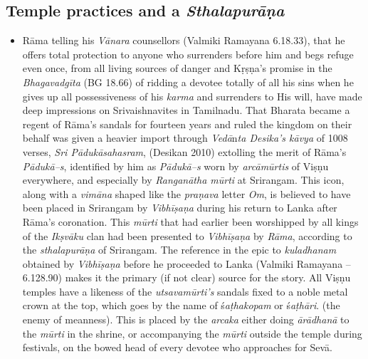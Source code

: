 \subsection*{Temple practices and a \textit{Sthalapurāṇa}}

\begin{itemize}
\item Rāma telling his \textit{Vānara} counsellors (Valmiki Ramayana 6.18.33), that he offers total protection to anyone who surrenders before him and begs refuge even once, from all living sources of danger and Kṛṣṇa’s promise in the \textit{Bhagavadgīta} (BG 18.66) of ridding a devotee totally of all his sins when he gives up all possessiveness of his \textit{karma} and surrenders to His will, have made deep impressions on Srivaishnavites in Tamilnadu. That Bharata became a regent of Rāma’s sandals for fourteen years and ruled the kingdom on their behalf was given a heavier import through \textit{Vedā}n\textit{ta Desika’s kāvya} of 1008 verses, \textit{Sri Pādukāsahasram}, (Desikan 2010) extolling the merit of Rāma’s \textit{Pādukā–s}, identified by him as \textit{Pādukā–s} worn by \textit{arcāmūrtis} of Viṣṇu everywhere, and especially by \textit{Ranganātha mūrti} at Srirangam. This icon, along with a \textit{vimāna} shaped like the \textit{praṇava} letter \textit{Om}, is believed to have been placed in Srirangam by \textit{Vibhīṣaṇa} during his return to Lanka after Rāma’s coronation. This \textit{mūrti} that had earlier been worshipped by all kings of the \textit{Ikṣvāku} clan had been presented to \textit{Vibhīṣaṇa} by \textit{Rāma}, according to the \textit{sthalapurāṇa} of Srirangam. The reference in the epic to \textit{kuladhanam} obtained by \textit{Vibhīṣaṇa} before he proceeded to Lanka (Valmiki Ramayana – 6.128.90) makes it the primary (if not clear) source for the story. All Viṣṇu temples have a likeness of the \textit{utsavamūrti’s} sandals fixed to a noble metal crown at the top, which goes by the name of ś\textit{aṭhakopam} or ś\textit{aṭhāri}. (the enemy of meanness). This is placed by the \textit{arcaka} either doing \textit{ārādhanā} to the \textit{mūrti} in the shrine, or accompanying the \textit{mūrti} outside the temple during festivals, on the bowed head of every devotee who approaches for Sevā.

\end{itemize}

